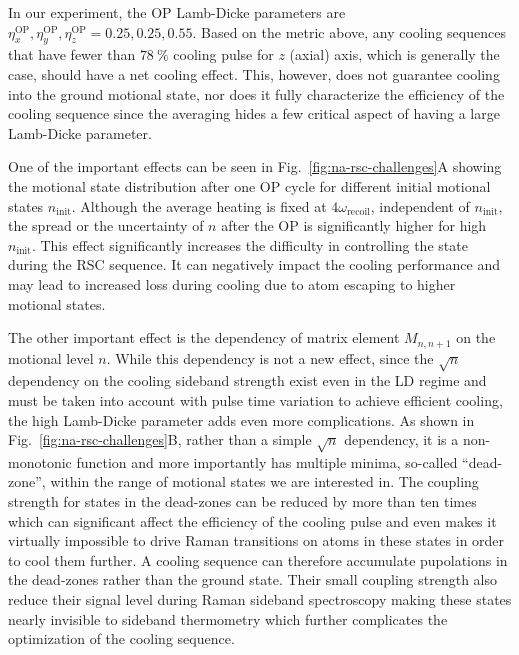 In our experiment, the OP Lamb-Dicke parameters are
$\eta^{\mathrm{OP}}_x, \eta^{\mathrm{OP}}_y, \eta^{\mathrm{OP}}_z = 0.25, 0.25, 0.55$.
Based on the metric above, any cooling sequences
that have fewer than $78~\%$ cooling pulse for $z$ (axial) axis, which is generally the case,
should have a net cooling effect.
This, however, does not guarantee cooling into the ground motional state,
nor does it fully characterize the efficiency of the cooling sequence
since the averaging hides a few critical aspect of having a large Lamb-Dicke parameter.

One of the important effects can be seen in Fig.~\ref{fig:na-rsc-challenges}A showing
the motional state distribution after one OP cycle
for different initial motional states $n_{\mathrm{init}}$.
Although the average heating is fixed at $4\omega_{\mathrm{recoil}}$,
independent of $n_{\mathrm{init}}$,
the spread or the uncertainty of $n$ after the OP is significantly
higher for high $n_{\mathrm{init}}$.
This effect significantly increases the difficulty in controlling the state during the
RSC sequence. It can negatively impact the cooling performance and
may lead to increased loss during cooling due to atom escaping to higher motional states.

The other important effect is the dependency of matrix element $M_{n,n+1}$
on the motional level $n$.
While this dependency is not a new effect, since the $\sqrt{n}$ dependency
on the cooling sideband strength exist even in the LD regime
and must be taken into account with pulse time variation
\cite{wineland_experimental_1998,liu_molecular_2019}
to achieve efficient cooling, the high Lamb-Dicke parameter adds even more complications.
As shown in Fig.~\ref{fig:na-rsc-challenges}B, rather than a simple $\sqrt{n}$ dependency,
it is a non-monotonic function and more importantly has multiple minima, so-called ``dead-zone'',
within the range of motional states we are interested in.
The coupling strength for states in the dead-zones can be reduced by more than ten times
which can significant affect the efficiency of the cooling pulse
and even makes it virtually impossible to drive Raman transitions on atoms in these states
in order to cool them further.
A cooling sequence can therefore accumulate pupolations in the dead-zones
rather than the ground state.
Their small coupling strength also reduce their signal level during
Raman sideband spectroscopy making these states nearly invisible to sideband thermometry
which further complicates the optimization of the cooling sequence.

